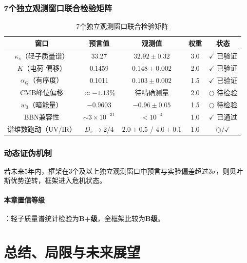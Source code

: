 \documentclass[12pt,a4paper,twocolumn]{article}
\begin{document}
\subsubsection{7个独立观测窗口联合检验矩阵}
\begin{table}[H]
\centering
\footnotesize
\caption{7个独立观测窗口联合检验矩阵}
\begin{tabular}{c|c|c|c|c}
\hline
\textbf{窗口} & \textbf{预言值} & \textbf{观测值} & \textbf{权重} & \textbf{状态} \\
\hline
$\kappa_s$（轻子质量谱） & 33.27 & $32.92\pm0.32$ & 3.0 & $\checkmark$ 已验证 \\
$K$（电荷-偏移） & 0.1459 & $0.148\pm0.002$ & 2.0 & $\checkmark$ 已验证 \\
$\alpha_Q$（有序度） & 0.1011 & $0.103\pm0.002$ & 1.5 & $\checkmark$ 已验证 \\
CMB峰位偏移 & $\approx -1.13\%$ & 待精确测量 & 2.0 & $\bigcirc$ 待检验 \\
$w_0$（暗能量） & $-0.9603$ & $-0.96\pm0.05$ & 1.5 & $\bigcirc$ 待检验 \\
BBN兼容性 & $\sim\!3\times 10^{-31}$ & $<10^{-4}$ & 1.0 & $\checkmark$ 已通过 \\
谱维数跑动（UV/IR） & $D_s\to2/4$ & $2.0\pm0.5$ / $4.0\pm0.1$ & 1.0 & $\bigcirc$/$\checkmark$ \\
\hline
\end{tabular}
\end{table}

\subsubsection{动态证伪机制}
若未来5年内，框架在3个及以上独立观测窗口中预言与实验偏差超过3$\sigma$，则贝叶斯优势逆转，框架进入危机状态。

\paragraph{本章置信等级}：轻子质量谱统计检验为\textbf{B+级}，全框架比较为\textbf{B级}。

\section{总结、局限与未来展望}
\end{document}

